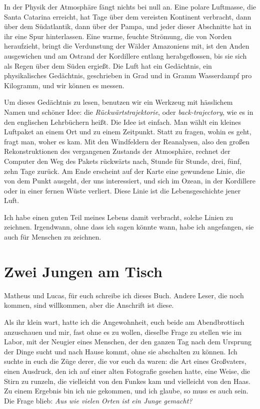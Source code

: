 \documentclass[
  ngerman,
  11pt,
  openany]{book}
\begin{document}
In der Physik der Atmosphäre fängt nichts bei null an. Eine polare
Luftmasse, die Santa Catarina erreicht, hat Tage über dem vereisten
Kontinent verbracht, dann über dem Südatlantik, dann über der Pampa, und
jeder dieser Abschnitte hat in ihr eine Spur hinterlassen. Eine warme,
feuchte Strömung, die von Norden heraufzieht, bringt die Verdunstung der
Wälder Amazoniens mit, ist den Anden ausgewichen und am Ostrand der
Kordillere entlang herabgeflossen, bis sie sich als Regen über dem Süden
ergießt. Die Luft hat ein Gedächtnis, ein physikalisches Gedächtnis,
geschrieben in Grad und in Gramm Wasserdampf pro Kilogramm, und wir
können es messen.

Um dieses Gedächtnis zu lesen, benutzen wir ein Werkzeug mit hässlichem
Namen und schöner Idee: die \emph{Rückwärtstrajektorie}, oder
\emph{back-trajectory}, wie es in den englischen Lehrbüchern heißt. Die
Idee ist einfach. Man wählt ein kleines Luftpaket an einem Ort und zu
einem Zeitpunkt. Statt zu fragen, wohin es geht, fragt man, woher es
kam. Mit den Windfeldern der Reanalysen, also den großen
Rekonstruktionen des vergangenen Zustands der Atmosphäre, rechnet der
Computer den Weg des Pakets rückwärts nach, Stunde für Stunde, drei,
fünf, zehn Tage zurück. Am Ende erscheint auf der Karte eine gewundene
Linie, die von dem Punkt ausgeht, der uns interessiert, und sich im
Ozean, in der Kordillere oder in einer fernen Wüste verliert. Diese
Linie ist die Lebensgeschichte jener Luft.

Ich habe einen guten Teil meines Lebens damit verbracht, solche Linien
zu zeichnen. Irgendwann, ohne dass ich sagen könnte wann, habe ich
angefangen, sie auch für Menschen zu zeichnen.

\section{Zwei Jungen am Tisch}\label{zwei-jungen-am-tisch}

Matheus und Lucas, für euch schreibe ich dieses Buch. Andere Leser, die
noch kommen, sind willkommen, aber die Anschrift ist diese.

Als ihr klein wart, hatte ich die Angewohnheit, euch beide am
Abendbrottisch anzuschauen und mir, fast ohne es zu wollen, dieselbe
Frage zu stellen wie im Labor, mit der Neugier eines Menschen, der den
ganzen Tag nach dem Ursprung der Dinge sucht und nach Hause kommt, ohne
sie abschalten zu können. Ich suchte in euch die Züge derer, die vor
euch da waren: die Art eines Großvaters, einen Ausdruck, den ich auf
einer alten Fotografie gesehen hatte, eine Weise, die Stirn zu runzeln,
die vielleicht von den Funkes kam und vielleicht von den Haas. Zu einem
Ergebnis bin ich nie gekommen, und ich glaube, so muss es auch sein. Die
Frage blieb: \emph{Aus wie vielen Orten ist ein Junge gemacht?}
\end{document}
